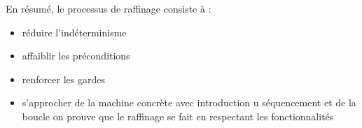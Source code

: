 \documentclass[11pt,a4paper,xcolor=table]{beamer} %
\begin{document}
\begin{frame}
En résumé, le processus de raffinage consiste à :
\begin{itemize}
\item réduire l'indéterminisme
\item affaiblir les préconditions
\item renforcer les gardes
\item s'approcher de la machine concrète avec introduction u séquencement et de la boucle
on prouve que le raffinage se fait en respectant les fonctionnalités
\end{itemize}
\end{frame}

\end{document}
